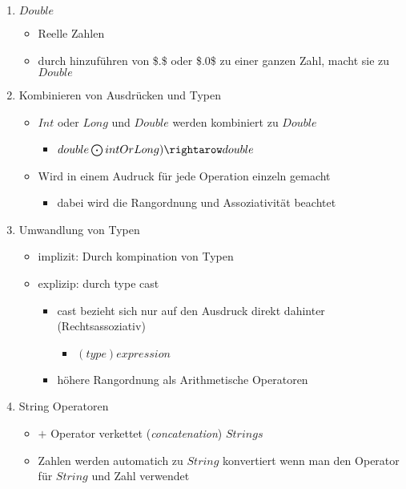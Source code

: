 \documentclass[11pt]{article}
\begin{document}
\begin{enumerate}
\item \(Double\)
\label{sec:orgb3f8088}
\begin{itemize}
\item Reelle Zahlen\\
\item durch hinzuführen von \$.\$ oder \$.0\$ zu einer ganzen Zahl,  macht sie zu \(Double\)\\
\end{itemize}

\item Kombinieren von Ausdrücken und Typen
\label{sec:org715a9d1}
\begin{itemize}
\item \(Int\) oder \(Long\) und \(Double\) werden kombiniert zu \(Double\)\\
\begin{itemize}
\item \(double \bigodot intOrLong) \rightarow  double\)\\
\end{itemize}
\item Wird in einem Audruck für jede Operation einzeln gemacht\\
\begin{itemize}
\item dabei wird die Rangordnung und Assoziativität beachtet\\
\end{itemize}
\end{itemize}

\item Umwandlung von Typen
\label{sec:org33e5bc8}
\begin{itemize}
\item implizit: Durch kompination von Typen\\
\item explizip: durch type cast\\
\begin{itemize}
\item cast bezieht sich nur auf den Ausdruck direkt dahinter (Rechtsassoziativ)\\
\begin{itemize}
\item \((type) expression\)\\
\end{itemize}
\item höhere Rangordnung als Arithmetische Operatoren\\
\end{itemize}
\end{itemize}

\item String Operatoren
\label{sec:orge6e6c52}
\begin{itemize}
\item \(+\) Operator verkettet (\emph{concatenation}) \(Strings\)\\
\item Zahlen werden automatich zu \(String\) konvertiert wenn man den Operator für \(String\) und Zahl verwendet\\
\end{itemize}
\end{enumerate}
\end{document}
